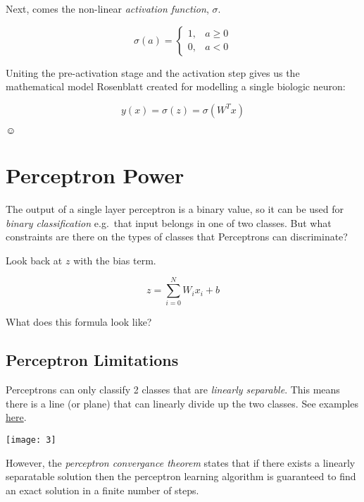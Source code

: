 \documentclass[letterpaper,12pt]{article}
\begin{document}
Next, comes the non-linear \emph{activation function}, $\sigma$.

\[
    \sigma(a) =
    \begin{cases}
        1, & a \ge 0\\
        0, & a < 0
    \end{cases}
\]

Uniting the pre-activation stage and the activation step gives us the
mathematical model Rosenblatt created for modelling a single biologic neuron:

\[
    y(x) = \sigma(z) =  \sigma(W^{T}x)
\]

$\smiley$

\section{Perceptron Power}

The output of a single layer perceptron is a binary value, so it can be used
for \emph{binary classification} e.g.\ that input belongs in one of two classes.
But what constraints are there on the types of classes that Perceptrons can
discriminate?

Look back at $z$ with the bias term.

\[
    z = \sum_{i=0}^{N} W_i x_i + b
\]

What does this formula look like?

\subsection{Perceptron Limitations}

Perceptrons can only classify 2 classes that are \emph{linearly separable}.
This means there is a line (or plane) that can linearly divide up the two
classes. See examples \href{https://en.wikipedia.org/wiki/Linear_separability}{here}.

\texttt{[image: 3]}

However, the \emph{perceptron convergance theorem} states that if there exists
a linearly separatable solution then the perceptron learning algorithm is
guaranteed to find an exact solution in a finite number of steps.
\end{document}
